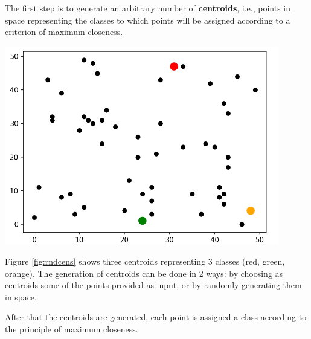 \documentclass{report}
\begin{document}
\begin{minipage}[b]{0.48\textwidth}
  The first step is to generate an arbitrary number of \textbf{centroids}, i.e., points in space representing the classes to which points will be assigned according to a criterion of maximum closeness.

  \begin{center}
      \includegraphics[width = 0.9\textwidth]{imgs/rndcens.png}
      \label{fig:rndcens}
  \end{center}

  Figure \ref{fig:rndcens} shows three centroids representing 3 classes (red, green, orange). The generation of centroids can be done in 2 ways: by choosing as centroids some of the points provided as input, or by randomly generating them in space.

  After that the centroids are generated, each point is assigned a class according to the principle of maximum closeness. 

\end{minipage}
\hspace{0.1in}
\end{document}
